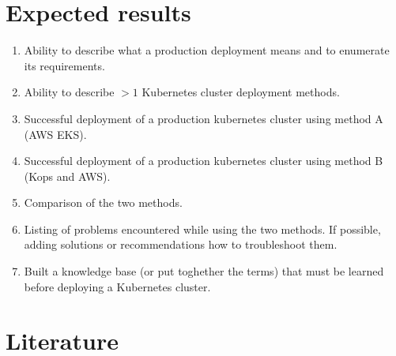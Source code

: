 \documentclass[12pt]{article}
\begin{document}
\section{Expected results}
\begin{enumerate}
    \item Ability to describe what a production deployment means and to enumerate its requirements.
    \item Ability to describe $>1$ Kubernetes cluster deployment methods.
    \item Successful deployment of a production kubernetes cluster using method A (AWS EKS).
    \item Successful deployment of a production kubernetes cluster using method B (Kops and AWS).
    \item Comparison of the two methods.
    \item Listing of problems encountered while using the two methods. If possible, adding solutions or recommendations how to troubleshoot them.
    \item Built a knowledge base (or put toghether the terms) that must be learned before deploying a Kubernetes cluster.
\end{enumerate}

\section{Literature}
\end{document}
